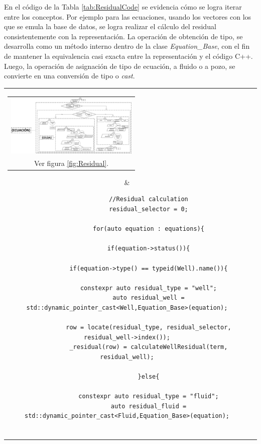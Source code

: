 En el código de la Tabla \ref{tab:ResidualCode} se evidencia cómo se logra iterar entre los conceptos. Por ejemplo para las ecuaciones, usando los vectores con los que se emula la base de datos, se logra realizar el cálculo del residual consistentemente con la representación. La operación de obtención de tipo, se desarrolla como un método interno dentro de la clase \textit{Equation\_Base}, con el fin de mantener la equivalencia casi exacta entre la representación y el código C++. Luego, la operación de asignación de tipo de ecuación, a fluido o a pozo, se convierte en una conversión de tipo o \textit{cast}.

\begin{table}[h!]
	\centering
	\begin{tabular}{cc}
		\parbox[c]{7em}{
			\begin{tabular}[c]{@{}c@{}}\includegraphics[width=2.5in]{Fig/Residual.pdf}\\ Ver figura \ref{fig:Residual}.\end{tabular}
		}
		&
		\begin{tiny}
			\begin{lstlisting}
			//Residual calculation
			residual_selector = 0;
			
			for(auto equation : equations){
			
			if(equation->status()){
			
			if(equation->type() == typeid(Well).name()){
			
			constexpr auto residual_type = "well";
			auto residual_well = std::dynamic_pointer_cast<Well,Equation_Base>(equation);
			
			row = locate(residual_type, residual_selector, residual_well->index());
			_residual(row) = calculateWellResidual(term, residual_well);
			
			}else{
			
			constexpr auto residual_type = "fluid";
			auto residual_fluid = std::dynamic_pointer_cast<Fluid,Equation_Base>(equation);
			

\end{lstlisting}
\end{tiny}
\end{tabular}
\end{table}
